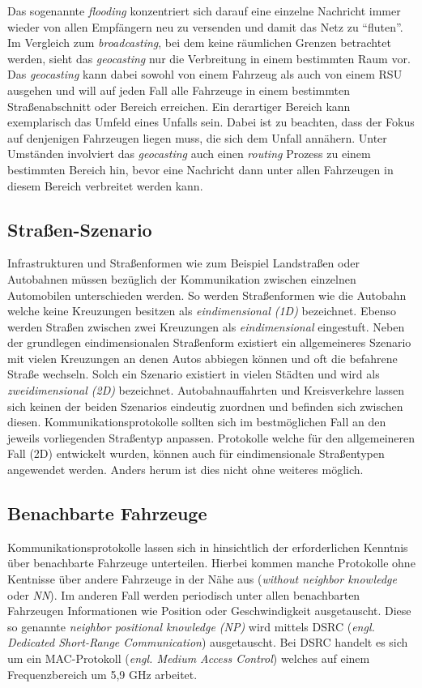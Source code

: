 \documentclass[english,runningheads,a4paper]{llncs}[2018/03/10]
\begin{document}
Das sogenannte \textit{flooding} konzentriert sich darauf eine einzelne Nachricht immer wieder von allen Empfängern neu zu versenden und damit das Netz zu ``fluten''.
Im Vergleich zum \textit{broadcasting}, bei dem keine räumlichen Grenzen betrachtet werden, sieht das \textit{geocasting} nur die Verbreitung in einem bestimmten Raum vor.
Das \textit{geocasting} kann dabei sowohl von einem Fahrzeug als auch von einem RSU ausgehen und will auf jeden Fall alle Fahrzeuge in einem bestimmten Straßenabschnitt oder Bereich erreichen.
Ein derartiger Bereich kann exemplarisch das Umfeld eines Unfalls sein.
Dabei ist zu beachten, dass der Fokus auf denjenigen Fahrzeugen liegen muss, die sich dem Unfall annähern.
Unter Umständen involviert das \textit{geocasting} auch einen \textit{routing} Prozess zu einem bestimmten Bereich hin, bevor eine Nachricht dann unter allen Fahrzeugen in diesem Bereich verbreitet werden kann\cite{conti2013mobile}.

\subsection{Straßen-Szenario}\label{subsec:strassen-szenario}
Infrastrukturen und Straßenformen wie zum Beispiel Landstraßen oder Autobahnen müssen bezüglich der Kommunikation zwischen einzelnen Automobilen unterschieden werden.
So werden Straßenformen wie die Autobahn welche keine Kreuzungen besitzen als \textit{eindimensional (1D)} bezeichnet.
Ebenso werden Straßen zwischen zwei Kreuzungen als \textit{eindimensional} eingestuft.
Neben der grundlegen eindimensionalen Straßenform existiert ein allgemeineres Szenario mit vielen Kreuzungen an denen Autos abbiegen können und oft die befahrene Straße wechseln.
Solch ein Szenario existiert in vielen Städten und wird als \textit{zweidimensional (2D)} bezeichnet.
Autobahnauffahrten und Kreisverkehre lassen sich keinen der beiden Szenarios eindeutig zuordnen und befinden sich zwischen diesen.
Kommunikationsprotokolle sollten sich im bestmöglichen Fall an den jeweils vorliegenden Straßentyp anpassen.
Protokolle welche für den allgemeineren Fall (2D) entwickelt wurden, können auch für eindimensionale Straßentypen angewendet werden.
Anders herum ist dies nicht ohne weiteres möglich\cite{conti2013mobile}.

\subsection{Benachbarte Fahrzeuge}\label{subsec:benachbarte-fahrzeuge}
Kommunikationsprotokolle lassen sich in hinsichtlich der erforderlichen Kenntnis über benachbarte Fahrzeuge unterteilen.
Hierbei kommen manche Protokolle ohne Kentnisse über andere Fahrzeuge in der Nähe aus (\textit{without neighbor knowledge} oder \textit{NN}).
Im anderen Fall werden periodisch unter allen benachbarten Fahrzeugen Informationen wie Position oder Geschwindigkeit ausgetauscht.
Diese so genannte \textit{neighbor positional knowledge (NP)} wird mittels DSRC (\textit{engl. Dedicated Short-Range Communication}) ausgetauscht.
Bei DSRC handelt es sich um ein MAC-Protokoll (\textit{engl. Medium Access Control}) welches auf einem Frequenzbereich um 5,9 GHz arbeitet\cite{conti2013mobile}.
\end{document}
